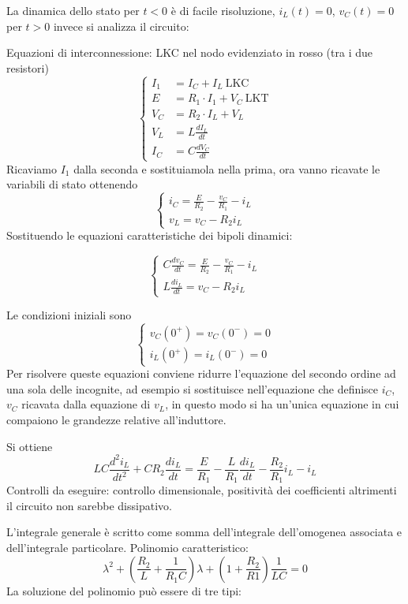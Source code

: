 La dinamica dello stato per $t<0$ è di facile risoluzione, $i_L(t) = 0$, $v_C(t) = 0$
per $t > 0$ invece si analizza il circuito:

Equazioni di interconnessione: 
LKC nel nodo evidenziato in rosso (tra i due resistori)
\begin{equation*}
\begin{cases}
 I_1 &= I_C+I_L \ \text{LKC}\\
 E &= R_1\cdot I_1 + V_C\ \text{LKT} \\
V_C &= R_2 \cdot I_L + V_L \\
V_L &= L\frac{dI_L}{dt} \\
I_C &= C\frac{dV_C}{dt}
\end{cases}
\end{equation*}
Ricaviamo $I_1$ dalla seconda e sostituiamola nella prima,
ora vanno ricavate le variabili di stato ottenendo
$$
\begin{cases}
i_C = \frac{E}{R_2} - \frac{v_C}{R_1} - i_L \\
v_L = v_C - R_2 i_L
\end{cases}
$$
Sostituendo le equazioni caratteristiche dei bipoli dinamici:

$$
\begin{cases}
C\frac{dv_C}{dt} = \frac{E}{R_2} - \frac{v_C}{R_1} - i_L \\
L\frac{di_L}{dt} = v_C - R_2 i_L
\end{cases}
$$

Le condizioni iniziali sono 
$$\begin{cases}
v_C(0^+) = v_C(0^-) = 0\\
i_L(0^+) = i_L(0^-) = 0
\end{cases}
$$
Per risolvere queste equazioni conviene ridurre l'equazione del secondo ordine ad una sola delle incognite,
ad esempio si sostituisce nell'equazione che definisce $i_C$, $v_C$ ricavata dalla equazione di
$v_L$, in questo modo si ha un'unica equazione in cui compaiono le grandezze relative all'induttore.

Si ottiene 
\begin{equation}
LC \frac{d^2i_L}{dt^2} + CR_2\frac{di_L}{dt} = \frac{E}{R_1} - \frac{L}{R_1}\frac{di_L}{dt} - \frac{R_2}{R_1}i_L-i_L
\end{equation}
Controlli da eseguire: controllo dimensionale, positività dei coefficienti altrimenti il circuito non sarebbe dissipativo.

L'integrale generale è scritto come somma dell'integrale dell'omogenea associata e dell'integrale particolare.
Polinomio caratteristico:
\begin{equation}
 \lambda^2 + (\frac{R_2}{L} + \frac{1}{R_1 C})\lambda + (1+\frac{R_2}{R1})\frac{1}{LC} = 0
\end{equation}
La soluzione del polinomio può essere di tre tipi:

